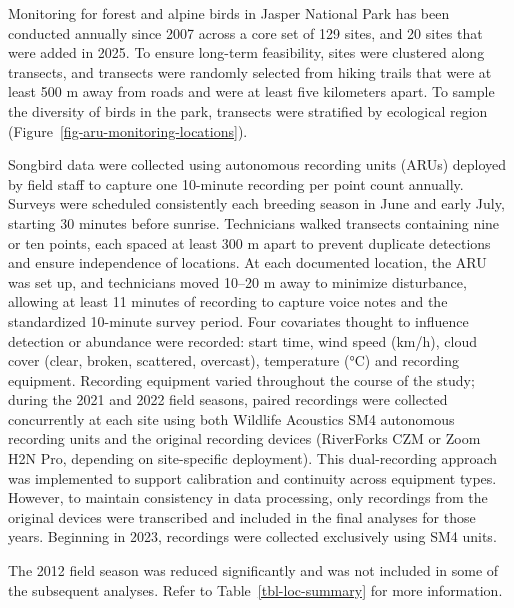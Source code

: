 \documentclass[
  letterpaper,
  DIV=11,
  numbers=noendperiod]{scrartcl}
\begin{document}
Monitoring for forest and alpine birds in Jasper National Park has been
conducted annually since 2007 across a core set of 129 sites, and 20
sites that were added in 2025. To ensure long-term feasibility, sites
were clustered along transects, and transects were randomly selected
from hiking trails that were at least 500 m away from roads and were at
least five kilometers apart. To sample the diversity of birds in the
park, transects were stratified by ecological region
(Figure~\ref{fig-aru-monitoring-locations}).

Songbird data were collected using autonomous recording units (ARUs)
deployed by field staff to capture one 10-minute recording per point
count annually. Surveys were scheduled consistently each breeding season
in June and early July, starting 30 minutes before sunrise. Technicians
walked transects containing nine or ten points, each spaced at least 300
m apart to prevent duplicate detections and ensure independence of
locations. At each documented location, the ARU was set up, and
technicians moved 10--20 m away to minimize disturbance, allowing at
least 11 minutes of recording to capture voice notes and the
standardized 10-minute survey period. Four covariates thought to
influence detection or abundance were recorded: start time, wind speed
(km/h), cloud cover (clear, broken, scattered, overcast), temperature
(°C) and recording equipment. Recording equipment varied throughout the
course of the study; during the 2021 and 2022 field seasons, paired
recordings were collected concurrently at each site using both Wildlife
Acoustics SM4 autonomous recording units and the original recording
devices (RiverForks CZM or Zoom H2N Pro, depending on site-specific
deployment). This dual-recording approach was implemented to support
calibration and continuity across equipment types. However, to maintain
consistency in data processing, only recordings from the original
devices were transcribed and included in the final analyses for those
years. Beginning in 2023, recordings were collected exclusively using
SM4 units.

\begin{tcolorbox}[enhanced jigsaw, toptitle=1mm, title=\textcolor{quarto-callout-note-color}{\faInfo}\hspace{0.5em}{Note}, colback=white, colbacktitle=quarto-callout-note-color!10!white, opacitybacktitle=0.6, breakable, rightrule=.15mm, coltitle=black, toprule=.15mm, titlerule=0mm, left=2mm, bottomtitle=1mm, bottomrule=.15mm, arc=.35mm, leftrule=.75mm, opacityback=0, colframe=quarto-callout-note-color-frame]

The 2012 field season was reduced significantly and was not included in
some of the subsequent analyses. Refer to Table~\ref{tbl-loc-summary}
for more information.

\end{tcolorbox}
\end{document}
